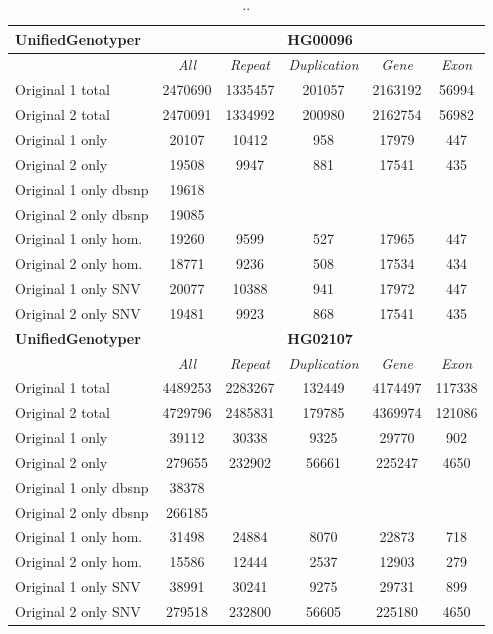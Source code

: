 \begin{table}[htb]
\begin{center}
\begin{tabular}{|l|c||c|c|c|c|}
\hline
{\bf UnifiedGenotyper} & \multicolumn{5}{|c|}{\bf HG00096} \\
\hline
\cline{2-6}
{\bf} & {\it All} & {\it Repeat} & {\it Duplication} & {\it Gene} & {\it Exon} \\
\hline
Original 1 total & 2470690 & 1335457 & 201057 & 2163192 & 56994\\ 
\hline
Original 2 total & 2470091 & 1334992 & 200980 & 2162754 & 56982\\ 
\hline
Original 1 only & 20107 & 10412 & 958 & 17979 & 447\\ 
\hline
Original 2 only & 19508 & 9947 & 881 & 17541 & 435\\ 
\hline
Original 1 only dbsnp & 19618 &  &  &  & \\ 
\hline
Original 2 only dbsnp & 19085 &  &  &  & \\ 
\hline
Original 1 only hom. & 19260 & 9599 & 527 & 17965 & 447\\ 
\hline
Original 2 only hom. & 18771 & 9236 & 508 & 17534 & 434\\ 
\hline
Original 1 only SNV & 20077 & 10388 & 941 & 17972 & 447\\ 
\hline
Original 2 only SNV & 19481 & 9923 & 868 & 17541 & 435\\ 
\hline
\hline
{\bf UnifiedGenotyper} & \multicolumn{5}{|c|}{\bf HG02107} \\
\hline
\cline{2-6}
{\bf} & {\it All} & {\it Repeat} & {\it Duplication} & {\it Gene} & {\it Exon} \\
\hline
Original 1 total & 4489253 & 2283267 & 132449 & 4174497 & 117338\\ 
\hline
Original 2 total & 4729796 & 2485831 & 179785 & 4369974 & 121086\\ 
\hline
Original 1 only & 39112 & 30338 & 9325 & 29770 & 902\\ 
\hline
Original 2 only & 279655 & 232902 & 56661 & 225247 & 4650\\ 
\hline
Original 1 only dbsnp & 38378 &  &  &  & \\ 
\hline
Original 2 only dbsnp & 266185 &  &  &  & \\ 
\hline
Original 1 only hom. & 31498 & 24884 & 8070 & 22873 & 718\\ 
\hline
Original 2 only hom. & 15586 & 12444 & 2537 & 12903 & 279\\ 
\hline
Original 1 only SNV & 38991 & 30241 & 9275 & 29731 & 899\\ 
\hline
Original 2 only SNV & 279518 & 232800 & 56605 & 225180 & 4650\\ 
\hline
\end{tabular}
\end{center}
\caption{ .. }
\label{tab:orig-vs-orig2-ug}
\end{table}

